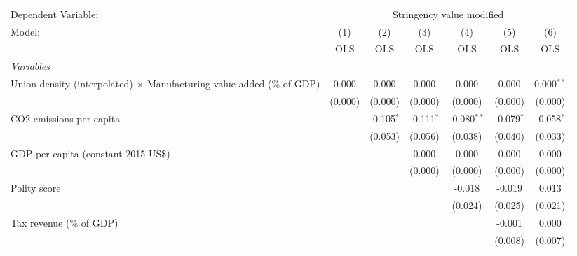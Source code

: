
\begingroup
\centering
\begin{tabular}{lcccccc}
   \toprule
   Dependent Variable: & \multicolumn{6}{c}{Stringency value modified}\\
   Model:                                                                        & (1)     & (2)          & (3)          & (4)           & (5)          & (6)\\  
                                                                                 &  OLS    & OLS          & OLS          & OLS           & OLS          & OLS\\  
   \midrule
   \emph{Variables}\\
   Union density (interpolated) $\times$ Manufacturing value added (\% of GDP)   & 0.000   & 0.000        & 0.000        & 0.000         & 0.000        & 0.000$^{**}$\\   
                                                                                 & (0.000) & (0.000)      & (0.000)      & (0.000)       & (0.000)      & (0.000)\\   
   CO2 emissions per capita                                                      &         & -0.105$^{*}$ & -0.111$^{*}$ & -0.080$^{**}$ & -0.079$^{*}$ & -0.058$^{*}$\\   
                                                                                 &         & (0.053)      & (0.056)      & (0.038)       & (0.040)      & (0.033)\\   
   GDP per capita (constant 2015 US\$)                                           &         &              & 0.000        & 0.000         & 0.000        & 0.000\\   
                                                                                 &         &              & (0.000)      & (0.000)       & (0.000)      & (0.000)\\   
   Polity score                                                                  &         &              &              & -0.018        & -0.019       & 0.013\\   
                                                                                 &         &              &              & (0.024)       & (0.025)      & (0.021)\\   
   Tax revenue (\% of GDP)                                                       &         &              &              &               & -0.001       & 0.000\\   
                                                                                 &         &              &              &               & (0.008)      & (0.007)\\   

\end{tabular}
